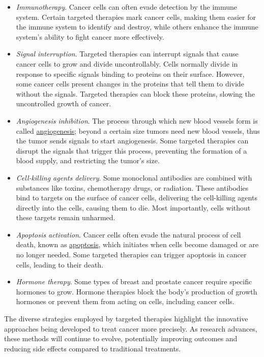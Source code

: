 \begin{itemize}
    \item \textit{Immunotherapy}. Cancer cells can often evade detection by the immune system. Certain targeted therapies mark cancer cells, making them easier for the immune system to identify and destroy, while others enhance the immune system's ability to fight cancer more effectively.
    \item \textit{Signal interruption}. Targeted therapies can interrupt signals that cause cancer cells to grow and divide uncontrollably. Cells normally divide in response to specific signals binding to proteins on their surface. However, some cancer cells present changes in the proteins that tell them to divide without the signals. Targeted therapies can block these proteins, slowing the uncontrolled growth of cancer.
    \item \textit{Angiogenesis inhibition}. The process through which new blood vessels form is called \href{https://en.wikipedia.org/wiki/Angiogenesis}{angiogenesis}; beyond a certain size tumors need new blood vessels, thus the tumor sends signals to start angiogenesis. Some targeted therapies can disrupt the signals that trigger this process, preventing the formation of a blood supply, and restricting the tumor's size. 
    \item \textit{Cell-killing agents delivery}. Some monoclonal antibodies are combined with substances like toxins, chemotherapy drugs, or radiation. These antibodies bind to targets on the surface of cancer cells, delivering the cell-killing agents directly into the cells, causing them to die. Most importantly, cells without these targets remain unharmed.
    \item \textit{Apoptosis activation}. Cancer cells often evade the natural process of cell death, known as \href{https://en.wikipedia.org/wiki/Apoptosis}{apoptosis}, which initiates when cells become damaged or are no longer needed. Some targeted therapies can trigger apoptosis in cancer cells, leading to their death.
    \item \textit{Hormone therapy}. Some types of breast and prostate cancer require specific hormones to grow. Hormone therapies block the body's production of growth hormones or prevent them from acting on cells, including cancer cells.
\end{itemize}

The diverse strategies employed by targeted therapies highlight the innovative approaches being developed to treat cancer more precisely. As research advances, these methods will continue to evolve, potentially improving outcomes and reducing side effects compared to traditional treatments.

